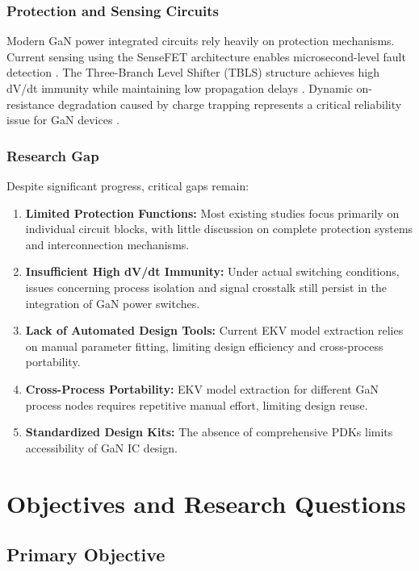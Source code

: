 \documentclass[12pt,a4paper]{article}
\begin{document}
\subsubsection{Protection and Sensing Circuits}

Modern GaN power integrated circuits rely heavily on protection mechanisms. Current sensing using the SenseFET architecture enables microsecond-level fault detection \cite{zhang2023sensefet}. The Three-Branch Level Shifter (TBLS) structure achieves high dV/dt immunity while maintaining low propagation delays \cite{zhang2022tbls}. Dynamic on-resistance degradation caused by charge trapping represents a critical reliability issue for GaN devices \cite{joh2014drain}.

\subsubsection{Research Gap}

Despite significant progress, critical gaps remain:

\begin{enumerate}[leftmargin=*]
    \item \textbf{Limited Protection Functions:} Most existing studies focus primarily on individual circuit blocks, with little discussion on complete protection systems and interconnection mechanisms.
    \item \textbf{Insufficient High dV/dt Immunity:} Under actual switching conditions, issues concerning process isolation and signal crosstalk still persist in the integration of GaN power switches.
    \item \textbf{Lack of Automated Design Tools:} Current EKV model extraction relies on manual parameter fitting, limiting design efficiency and cross-process portability.
    \item \textbf{Cross-Process Portability:} EKV model extraction for different GaN process nodes requires repetitive manual effort, limiting design reuse.
    \item \textbf{Standardized Design Kits:} The absence of comprehensive PDKs limits accessibility of GaN IC design.
\end{enumerate}

\section{Objectives and Research Questions}

\subsection{Primary Objective}
\end{document}
